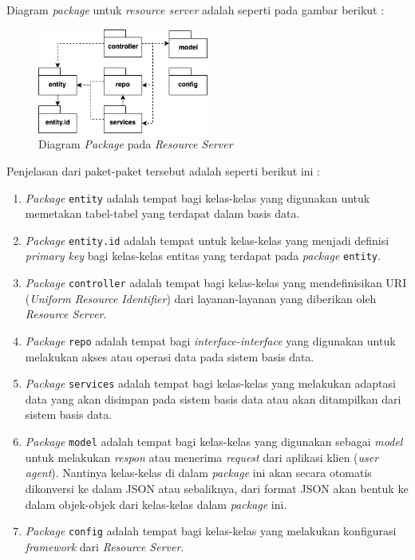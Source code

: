 \documentclass[pdftex,12pt, oneside]{article}
\begin{document}
Diagram \textit{package} untuk \textit{resource server} adalah seperti pada gambar berikut :

\begin{figure}[H]
	\centering
	\includegraphics[width=0.5\textwidth]{./resources/package-dia-resource-server}
	\caption{Diagram \textit{Package} pada \textit{Resource Server}}
	\label{fig:package-dia-resource-server}
\end{figure}

Penjelasan dari paket-paket tersebut adalah seperti berikut ini :

\begin{enumerate}
	\item \textit{Package} \texttt{entity} adalah tempat bagi kelas-kelas yang digunakan untuk memetakan tabel-tabel yang terdapat dalam basis data.
	
	\item \textit{Package} \texttt{entity.id} adalah tempat untuk kelas-kelas yang menjadi definisi \textit{primary key} bagi kelas-kelas entitas yang terdapat pada \textit{package} \texttt{entity}.
	
	\item \textit{Package} \texttt{controller} adalah tempat bagi kelas-kelas yang mendefinisikan URI (\textit{Uniform Resource Identifier}) dari layanan-layanan yang diberikan oleh \textit{Resource Server}.
	
	\item \textit{Package} \texttt{repo} adalah tempat bagi \textit{interface-interface} yang digunakan untuk melakukan akses atau operasi data pada sistem basis data.
	
	\item \textit{Package} \texttt{services} adalah tempat bagi kelas-kelas yang melakukan adaptasi data yang akan disimpan pada sistem basis data atau akan ditampilkan dari sistem basis data.
	
	\item \textit{Package} \texttt{model} adalah tempat bagi kelas-kelas yang digunakan sebagai \textit{model} untuk melakukan \textit{respon} atau menerima \textit{request} dari aplikasi klien (\textit{user agent}). Nantinya kelas-kelas di dalam \textit{package} ini akan secara otomatis dikonversi ke dalam JSON atau sebaliknya, dari format JSON akan bentuk ke dalam objek-objek dari kelas-kelas dalam \textit{package} ini.
	
	\item \textit{Package} \texttt{config} adalah tempat bagi kelas-kelas yang melakukan konfigurasi \textit{framework} dari \textit{Resource Server}.
	
\end{enumerate}
\end{document}
